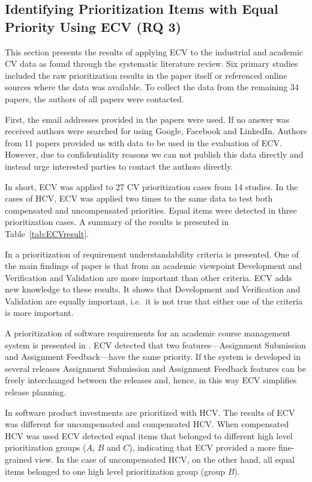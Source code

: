 \subsection{\label{rq3}Identifying Prioritization Items with Equal Priority Using ECV (RQ 3)}
This section presents the results of applying ECV to the industrial and academic CV data as found through the systematic literature review. Six primary studies included the raw prioritization results in the paper itself or referenced online sources where the data was available. To collect the data from the remaining 34 papers, the authors of all papers were contacted.

First, the email addresses provided in the papers were used. If no answer was received authors were searched for using Google, Facebook and LinkedIn. Authors from 11 papers provided us with data to be used in the evaluation of ECV. However, due to confidentiality reasons we can not publish this data directly and instead urge interested parties to contact the authors directly.

In short, ECV was applied to 27 CV prioritization cases from 14 studies.
In the cases of HCV, ECV was applied two times to the same data to test both compensated and uncompensated priorities. Equal items were detected in three prioritization cases. A summary of the results is presented in Table~\ref{tab:ECVresult}.

In \citep{Svahnberg2008} a prioritization of requirement understandability criteria is presented.
One of the main findings of paper \citep{Svahnberg2008} is that from an academic viewpoint Development and Verification and Validation are more important than other criteria.
ECV adds new knowledge to these results.
It shows that Development and Verification and Validation are equally important, i.e.\ it is not true that either one of the criteria is more important.

A prioritization of software requirements for an academic course management system is presented in \citep{Berander2009a}. ECV detected that two features---Assignment Submission and Assignment Feedback---have the same priority.
If the system is developed in several releases Assignment Submission and Assignment Feedback features can be freely interchanged between the releases and, hence, in this way ECV simplifies release planning.

In \citep{Barney2009} software product investments are prioritized with HCV.
The results of ECV was different for uncompensated and compensated HCV.
When compensated HCV was used ECV detected equal items that belonged to different high level prioritization groups ($A$, $B$ and $C$), indicating that ECV provided a more fine-grained view. In the case of uncompensated HCV, on the other hand, all equal items belonged to one high level prioritization group (group $B$).

